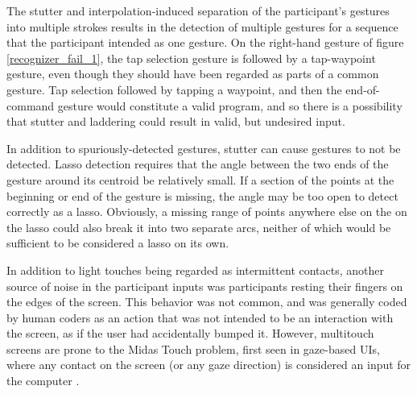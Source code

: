 The stutter and interpolation-induced separation of the  participant's gestures into multiple strokes results in the detection of multiple gestures for a sequence that the participant intended as one gesture. 
On the right-hand gesture of figure \ref{recognizer_fail_1}, the tap selection gesture is followed by a tap-waypoint gesture, even though they should have been regarded as parts of a common gesture. 
Tap selection followed by tapping a waypoint, and then the end-of-command gesture would constitute a valid program, and so there is a possibility that stutter and laddering could result in valid, but undesired input. 

In addition to spuriously-detected gestures, stutter can cause gestures to not be detected. 
Lasso detection requires that the angle between the two ends of the gesture around its centroid be relatively small. 
If a section of the points at the beginning or end of the gesture is missing, the angle may be too open to detect correctly as a lasso. 
Obviously, a missing range of points anywhere else on the on the lasso could also break it into two separate arcs, neither of which would be sufficient to be considered a lasso on its own. 

In addition to light touches being regarded as intermittent contacts, another source of noise in the participant inputs was participants resting their fingers on the edges of the screen. 
This behavior was not common, and was generally coded by human coders as an action that was not intended to be an interaction with the screen, as if the user had accidentally bumped it. 
However, multitouch screens are prone to the Midas Touch problem, first seen in gaze-based UIs, where any contact on the screen (or any gaze direction) is considered an input for the computer \citep{jacob1990you}. 

